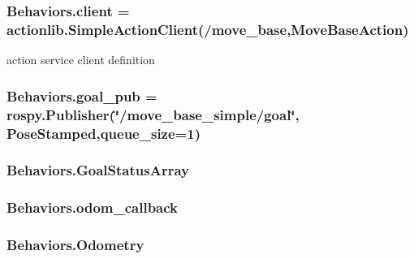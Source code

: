 \subsubsection[{\texorpdfstring{client}{client}}]{\setlength{\rightskip}{0pt plus 5cm}Behaviors.\+client = actionlib.\+Simple\+Action\+Client(\textquotesingle{}/move\+\_\+base\textquotesingle{},Move\+Base\+Action)}\hypertarget{namespaceBehaviors_a480c99d5a0219bba3f364d4022512bda}{}\label{namespaceBehaviors_a480c99d5a0219bba3f364d4022512bda}


action service client definition 

\subsubsection[{\texorpdfstring{goal\+\_\+pub}{goal_pub}}]{\setlength{\rightskip}{0pt plus 5cm}Behaviors.\+goal\+\_\+pub = rospy.\+Publisher(\char`\"{}/move\+\_\+base\+\_\+simple/goal\char`\"{}, Pose\+Stamped,{\bf queue\+\_\+size}=1)}\hypertarget{namespaceBehaviors_ad0289fe265166267c21567f44c2ecba7}{}\label{namespaceBehaviors_ad0289fe265166267c21567f44c2ecba7}
\subsubsection[{\texorpdfstring{Goal\+Status\+Array}{GoalStatusArray}}]{\setlength{\rightskip}{0pt plus 5cm}Behaviors.\+Goal\+Status\+Array}\hypertarget{namespaceBehaviors_a53817d008ea8a92222a7b07415fd0e7e}{}\label{namespaceBehaviors_a53817d008ea8a92222a7b07415fd0e7e}
\subsubsection[{\texorpdfstring{odom\+\_\+callback}{odom_callback}}]{\setlength{\rightskip}{0pt plus 5cm}Behaviors.\+odom\+\_\+callback}\hypertarget{namespaceBehaviors_a53b9b8729733e5fde4c917a2068d6c92}{}\label{namespaceBehaviors_a53b9b8729733e5fde4c917a2068d6c92}
\subsubsection[{\texorpdfstring{Odometry}{Odometry}}]{\setlength{\rightskip}{0pt plus 5cm}Behaviors.\+Odometry}\hypertarget{namespaceBehaviors_a458a2eb75561d95075537ee82dea289c}{}\label{namespaceBehaviors_a458a2eb75561d95075537ee82dea289c}


